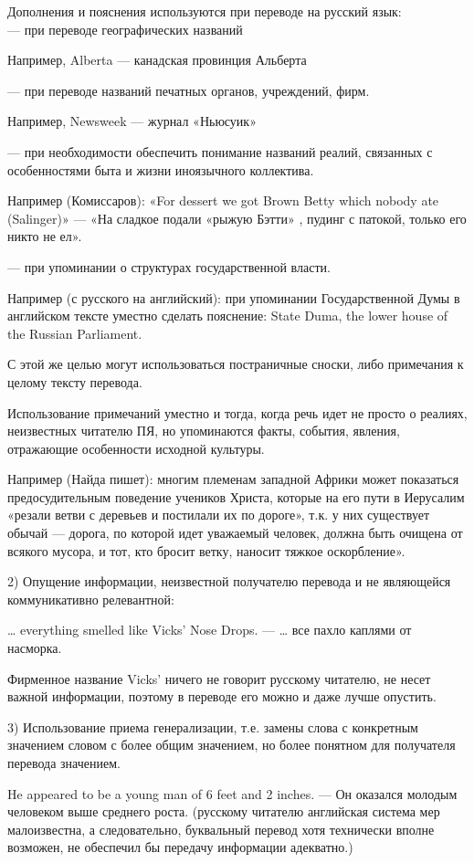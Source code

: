 Дополнения и пояснения используются при переводе на русский язык:
\\
--- при переводе географических названий

Например, Alberta --- канадская провинция Альберта

--- при переводе названий печатных органов, учреждений, фирм.

Например, Newsweek --- журнал «Ньюсуик»

--- при необходимости обеспечить понимание названий реалий, связанных с особенностями быта и жизни иноязычного коллектива.

Например (Комиссаров): «For dessert we got Brown Betty which nobody ate (Salinger)» --- «На сладкое подали «рыжую Бэтти» , пудинг с патокой, только его никто не ел».

--- при упоминании о структурах государственной власти.

Например (с русского на английский): при упоминании Государственной Думы в английском тексте уместно сделать пояснение: State Duma, the lower house of the Russian Parliament.

С этой же целью могут использоваться постраничные сноски, либо примечания к целому тексту перевода.

Использование примечаний уместно и тогда, когда речь идет не просто о реалиях, неизвестных читателю ПЯ, но упоминаются факты, события, явления, отражающие особенности исходной культуры.

Например (Найда пишет): многим племенам западной Африки может показаться предосудительным поведение учеников Христа, которые на его пути в Иерусалим «резали ветви с деревьев и постилали их по дороге», т.к. у них существует обычай --- дорога, по которой идет уважаемый человек, должна быть очищена от всякого мусора, и тот, кто бросит ветку, наносит тяжкое оскорбление».

2) Опущение информации, неизвестной получателю перевода и не являющейся коммуникативно релевантной:

… everything smelled like Vicks’ Nose Drops. --- … все пахло каплями от насморка.

Фирменное название Vicks' ничего не говорит русскому читателю, не несет важной информации, поэтому в переводе его можно и даже лучше опустить.

3) Использование приема генерализации, т.е. замены слова с конкретным значением словом с более общим значением, но более понятном для получателя перевода значением.

He appeared to be a young man of 6 feet and 2 inches. --- Он оказался молодым человеком выше среднего роста. (русскому читателю английская система мер малоизвестна, а следовательно, буквальный перевод хотя технически вполне возможен, не обеспечил бы передачу информации адекватно.)

